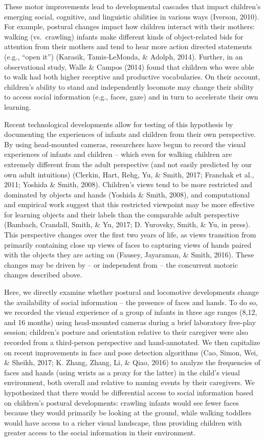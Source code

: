 \documentclass[10pt, letterpaper]{article}
\begin{document}
These motor improvements lead to developmental cascades that impact
children's emerging social, cognitive, and linguistic abilities in
various ways (Iverson, 2010). For example, postural changes impact how
children interact with their mothers: walking (vs.~crawling) infants
make different kinds of object-related bids for attention from their
mothers and tend to hear more action directed statements (e.g., ``open
it'') (Karasik, Tamis-LeMonda, \& Adolph, 2014). Further, in an
observational study, Walle \& Campos (2014) found that children who were
able to walk had both higher receptive and productive vocabularies. On
their account, children's ability to stand and independently locomote
may change their ability to access social information (e.g., faces,
gaze) and in turn to accelerate their own learning.

Recent technological developments allow for testing of this hypothesis
by documenting the experiences of infants and children from their own
perspective. By using head-mounted cameras, researchers have begun to
record the visual experiences of infants and children -- which even for
walking children are extremely different from the adult perspective (and
not easily predicted by our own adult intuitions) (Clerkin, Hart, Rehg,
Yu, \& Smith, 2017; Franchak et al., 2011; Yoshida \& Smith, 2008).
Children's views tend to be more restricted and dominated by objects and
hands (Yoshida \& Smith, 2008), and computational and empirical work
suggest that this restricted viewpoint may be more effective for
learning objects and their labels than the comparable adult perspective
(Bambach, Crandall, Smith, \& Yu, 2017; D. Yurovsky, Smith, \& Yu, in
press). This perspective changes over the first two years of life, as
views transition from primarily containing close up views of faces to
capturing views of hands paired with the objects they are acting on
(Fausey, Jayaraman, \& Smith, 2016). These changes may be driven by --
or independent from -- the concurrent motoric changes described above.

Here, we directly examine whether postural and locomotive developments
change the availability of social information -- the presence of faces
and hands. To do so, we recorded the visual experience of a group of
infants in three age ranges (8,12, and 16 months) using head-mounted
cameras during a brief laboratory free-play session; children's posture
and orientation relative to their caregiver were also recorded from a
third-person perspective and hand-annotated. We then capitalize on
recent improvements in face and pose detection algorithms (Cao, Simon,
Wei, \& Sheikh, 2017; K. Zhang, Zhang, Li, \& Qiao, 2016) to analyze the
frequencies of faces and hands (using wrists as a proxy for the latter)
in the child's visual environment, both overall and relative to naming
events by their caregivers. We hypothesized that there would be
differential access to social information based on children's postural
developments: crawling infants would see fewer faces because they would
primarily be looking at the ground, while walking toddlers would have
access to a richer visual landscape, thus providing children with
greater access to the social information in their environment.
\end{document}
